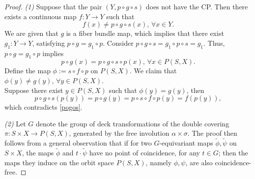 \documentclass{amsart}
\begin{document}
	\begin{proof} \textit{(1)}
		Suppose %
that the pair $(Y,p \circ g \circ s)$ does not have the CP. 
		Then there exists a continuous map $f : Y \to Y$ such that \begin{equation} \label{pogos}
			f(x) \neq p \circ g \circ s(x), \, \forall x \in Y.
		\end{equation}
		We are given that $g$ is a fiber bundle map, which implies that there exist  $g_1:Y\to Y$, satisfying  $p \circ g = g_1 \circ p.$
		Consider $p\circ g\circ s=g_1\circ p\circ s=g_1 $.
		Thus, $p \circ g = g_1 \circ p$ implies
		\[
		p \circ g(x) = p \circ g \circ s \circ p(x),\, \forall x \in P(S, X).
		\]
		Define the map $\phi := s \circ f \circ p$ on $P(S, X)$. We claim that $\phi(y)\neq g(y), \, \forall y \in P(S,X)$. \\ Suppose there exist $y \in P(S, X)$ such that $\phi(y) = g(y)$, then 
		\[
		p \circ g \circ s(p(y)) = p \circ g(y)
		= p \circ s \circ f \circ p (y) 
		= f(p(y)),
		\]
		which %
contradicts \eqref{pogos}.
		
		
		\textit{(2)} %
		Let $G$ %
denote the group of deck transformations of the double covering $\pi : S \times X \to P(S, X)$, generated by the free involution $\alpha \times \sigma.$
		The proof then follows %
from a general %
observation that if for two $G$-equivariant maps $\tilde\phi, \tilde\psi$ on $S\times X$, the maps $\tilde \phi$ and $t \cdot \tilde\psi$ have no point %
of coincidence, for any $t \in G$; %
then the maps they induce on the orbit space $P(S,X)$, namely $\phi, \psi$, are also coincidence-free.
	\end{proof}
	
\end{document}
